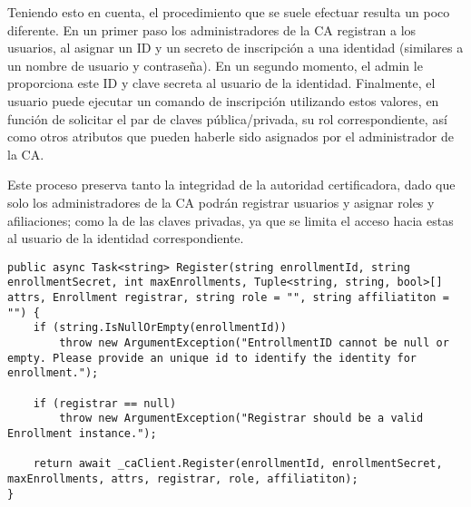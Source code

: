 Teniendo esto en cuenta, el procedimiento que se suele efectuar resulta un poco diferente. En un primer paso los administradores de la CA registran a los usuarios, al asignar un ID y un secreto de inscripción a una identidad (similares a un nombre de usuario y contraseña). En un segundo momento, el admin le proporciona este ID y clave secreta al usuario de la identidad. Finalmente, el usuario puede ejecutar un comando de inscripción utilizando estos valores, en funci\'on de solicitar el par de claves pública/privada, su rol correspondiente, as\'i como otros atributos que pueden haberle sido asignados por el administrador de la CA.

Este proceso preserva tanto la integridad de la autoridad certificadora, dado que solo los administradores de la CA podr\'an registrar usuarios y asignar roles y afiliaciones; como la de las claves privadas, ya que se limita el acceso hacia estas al usuario de la identidad correspondiente.


\begin{lstlisting}[caption={M\'etodo \texttt{Register} de la clase \texttt{CAService}.}, label={code:registerServ}]
public async Task<string> Register(string enrollmentId, string enrollmentSecret, int maxEnrollments, Tuple<string, string, bool>[] attrs, Enrollment registrar, string role = "", string affiliatiton = "") {
	if (string.IsNullOrEmpty(enrollmentId))
		throw new ArgumentException("EntrollmentID cannot be null or empty. Please provide an unique id to identify the identity for enrollment.");
	
	if (registrar == null)
		throw new ArgumentException("Registrar should be a valid Enrollment instance.");

	return await _caClient.Register(enrollmentId, enrollmentSecret, maxEnrollments, attrs, registrar, role, affiliatiton);
}
\end{lstlisting}

